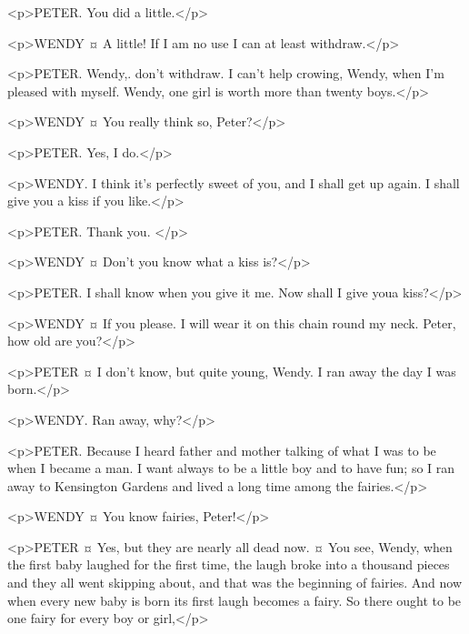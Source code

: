 <p>PETER. You did a little.</p>

<p>WENDY ¤
A little! If I am no use I can at least withdraw.</p>


<p>PETER. Wendy,. don't withdraw. I can't help crowing, Wendy, when I'm pleased with myself. Wendy, one girl is worth more than twenty boys.</p>

<p>WENDY ¤
You really think so, Peter?</p>

<p>PETER. Yes, I do.</p>

<p>WENDY. I think it's perfectly sweet of you, and I shall get up again.
I shall give you a kiss if you like.</p>

<p>PETER. Thank you.
</p>

<p>WENDY ¤
Don't you know what a kiss is?</p>

<p>PETER. I shall know when you give it me.
Now shall I give youa kiss?</p>

<p>WENDY ¤
If you please.
I will wear it on this chain round my neck. Peter, how old are you?</p>

<p>PETER ¤
I don't know, but quite young, Wendy. I ran away the day I was born.</p>

<p>WENDY. Ran away, why?</p>

<p>PETER. Because I heard father and mother talking of what I was to be when I became a man. I want always to be a little boy and to have fun; so I ran away to Kensington Gardens and lived a long time among the fairies.</p>

<p>WENDY ¤
You know fairies, Peter!</p>

<p>PETER ¤
Yes, but they are nearly all dead now.
¤
You see, Wendy, when the first baby laughed for the first time, the laugh broke into a thousand pieces and they all went skipping about, and that was the beginning of fairies. And now when every new baby is born its first laugh becomes a fairy. So there ought to be one fairy for every boy or girl,</p>

